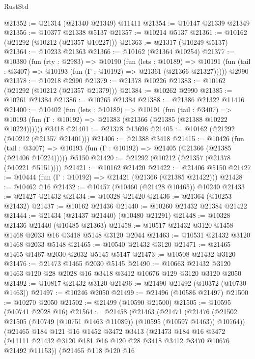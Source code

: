 \begin{lexlean}{RustStd}
\begin{coremodule}
@21352 := @21314 (@21340 @21349) @11411
@21354 := @10147 @21339 @21349
@21356 := @10377 @21338 @5137
@21357 := @10214 @5137
@21361 := @10162 (@21292 (@10212 (@21357 @10227)))
@21363 := @21317 (@10249 @5137)
@21364 := @10233 @21363
@21366 := @10162 (@21364 @10254)
@21377 := @10380
    (fun (rty : @2983) =>
    @10190
      (fun (lets : @10189) =>
      @10191 (fun (tail : @3407) => @10193 (fun (Γ : @10192) => @21361 (@21366 @21327)))))
    @2990
@21378 := @10218 @2990
@21379 := @21378 @10226
@21383 := @10162 (@21292 (@10212 (@21357 @21379)))
@21384 := @10262 @2990
@21385 := @10261 @21384
@21386 := @10265 @21384
@21388 := @21386 @21322 @11416
@21400 := @10402
    (fun (lets : @10189) =>
    @10191
      (fun (tail : @3407) =>
      @10193 (fun (Γ : @10192) => @21383 (@21366 (@21385 (@21388 @10222 @10224))))))
    @3418
@21401 := @21378 @13696
@21405 := @10162 (@21292 (@10212 (@21357 @21401)))
@21406 := @21388 @3418
@21415 := @10426
    (fun (tail : @3407) => @10193 (fun (Γ : @10192) => @21405 (@21366 (@21385 (@21406 @10224)))))
    @5150
@21420 := @21292 (@10212 (@21357 (@21378 (@10221 @5151))))
@21421 := @10162 @21420
@21422 := @21406 @5150
@21427 := @10444 (fun (Γ : @10192) => @21421 (@21366 (@21385 @21422)))
@21428 := @10462 @16
@21432 := @10457 (@10460 (@21428 @10465)) @10240
@21433 := @21427 @21432
@21434 := @10328 @21420
@21436 := @21364 (@10253 @21432)
@21437 := @10162 @21436
@21440 := @10260 @21432 @21384 @21422
@21444 := @21434 (@21437 @21440) (@10480 @21291)
@21448 := @10328 @21436 @21440 (@10485 @21363)
@21458 := @10517 @21432 @3120 @1458 @1468 @2033 @16 @3418 @5148 @3120 @2044
@21463 := @10531 @21432 @3120 @1468 @2033 @5148
@21465 := @10540 @21432 @3120
@21471 := @21465 @1465 @1467 @2030 @2032 @5145 @5147
@21473 := @10508 @21432 @3120
@21476 := @21473 @1465 @2030 @5145
@21490 := @10663 @21432 @3120 @1463 @120 @28 @2028 @16 @3418 @3412 @10676 @129 @3120 @3120 @2050
@21492 := @10817 @21432 @3120
@21496 := @21490 @21492 (@10372 (@10730 @1463))
@21497 := @10246 @2050
@21499 := @21496 (@10586 @21497)
@21500 := @10270 @2050
@21502 := @21499 (@10590 @21500)
@21505 := @10595 (@10741 @2028 @16)
@21564 := @21458
    (@21463
      (@21471
        (@21476 (@21502 @21505 (@10749 (@10751 @1463 @11089)) (@10595 (@10597 @1463)) @10764))
        (@21465
          @184
          @121
          @16
          @1452
          @3472
          @3413
          (@21473
            @184
            @16
            @3472
            (@11111 @21432 @3120 @181 @16 @120 @28 @3418 @3412 @3470 @10676 @21492 @11153))
          (@21465
            @118
            @120
            @16

\end{coremodule}
\end{lexlean}
